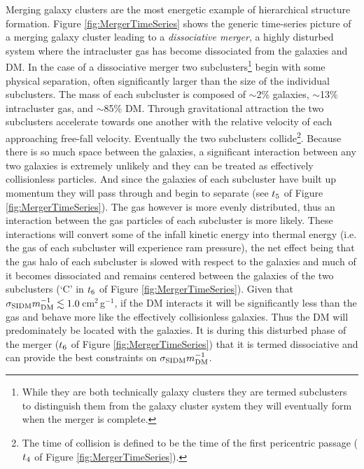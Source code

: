 Merging galaxy clusters are the most energetic example of hierarchical structure formation.
Figure \ref{fig:MergerTimeSeries} shows the generic time-series picture of a merging galaxy cluster leading to a \textit{dissociative merger}, a highly disturbed system where the intracluster gas has become dissociated from the galaxies and DM.
In the case of a dissociative merger two subclusters\footnote{While they are both technically galaxy clusters they are termed subclusters to distinguish them from the galaxy cluster system they will eventually form when the merger is complete.} begin with some physical separation, often significantly larger than the size of the individual subclusters.
The mass of each subcluster is composed of $\sim$2\% galaxies, $\sim$13\% intracluster gas, and $\sim$85\% DM.
Through gravitational attraction the two subclusters accelerate towards one another with the relative velocity of each approaching free-fall velocity.
Eventually the two subclusters collide\footnote{The time of collision is defined to be the time of the first pericentric passage ($t_{\rm 4}$ of Figure \ref{fig:MergerTimeSeries}).}. Because there is so much space between the galaxies, a significant interaction between any two galaxies is extremely unlikely and they can be treated as effectively collisionless particles.
And since the galaxies of each subcluster have built up momentum they will pass through and begin to separate (see $t_{\rm 5}$ of Figure \ref{fig:MergerTimeSeries}).
The gas however is more evenly distributed, thus an interaction between the gas particles of each subcluster is more likely.
These interactions will convert some of the infall kinetic energy into thermal energy (i.e. the gas of each subcluster will experience ram pressure), the net effect being that the gas halo of each subcluster is slowed with respect to the galaxies and much of it becomes dissociated and remains centered between the galaxies of the two subclusters (`C' in $t_{\rm 6}$ of Figure \ref{fig:MergerTimeSeries}).
Given that $\sigma_{\rm SIDM}m_{\rm DM}^{-1} \lesssim 1.0$\,cm$^2$\,g$^{-1}$, if the DM interacts it will be significantly less than the gas and behave more like the effectively collisionless galaxies.
Thus the DM will predominately be located with the galaxies. 
It is during this disturbed phase of the merger ($t_{\rm 6}$ of Figure \ref{fig:MergerTimeSeries}) that it is termed dissociative and can provide the best constraints on  $\sigma_{\rm SIDM}m_{\rm DM}^{-1}$.  

